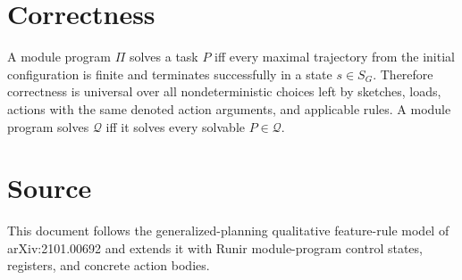 \documentclass[11pt]{article}
\begin{document}
\section{Correctness}

A module program $\Pi$ solves a task $P$ iff every maximal trajectory from
the initial configuration is finite and terminates successfully in a state
$s\in S_G$. Therefore correctness is universal over all nondeterministic choices
left by sketches, loads, actions with the same denoted action arguments, and
applicable rules. A module program solves $\mathcal Q$ iff it solves every solvable
$P\in\mathcal Q$.

\section*{Source}

This document follows the generalized-planning qualitative feature-rule model of
arXiv:2101.00692 and extends it with Runir module-program control states,
registers, and concrete action bodies.
\end{document}
